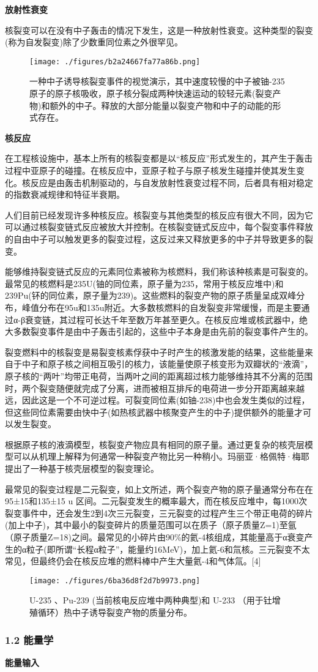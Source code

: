 \textbf{放射性衰变}

核裂变可以在没有中子轰击的情况下发生，这是一种放射性衰变。这种类型的裂变(称为自发裂变)除了少数重同位素之外很罕见。
\begin{figure}[ht]
\centering
\texttt{[image: ./figures/b2a24667fa77a86b.png]}
\caption{一种中子诱导核裂变事件的视觉演示，其中速度较慢的中子被铀-235原子的原子核吸收，原子核分裂成两种快速运动的较轻元素(裂变产物)和额外的中子。释放的大部分能量以裂变产物和中子的动能的形式存在。} \label{fig_HLB_1}
\end{figure}

\textbf{核反应}

在工程核设施中，基本上所有的核裂变都是以“核反应”形式发生的，其产生于轰击过程中亚原子的碰撞。在核反应中，亚原子粒子与原子核发生碰撞并使其发生变化。核反应是由轰击机制驱动的，与自发放射性衰变过程不同，后者具有相对稳定的指数衰减规律和特征半衰期。

人们目前已经发现许多种核反应。核裂变与其他类型的核反应有很大不同，因为它可以通过核裂变链式反应被放大并控制。在核裂变链式反应中，每个裂变事件释放的自由中子可以触发更多的裂变过程，这反过来又释放更多的中子并导致更多的裂变。

能够维持裂变链式反应的元素同位素被称为核燃料，我们称该种核素是可裂变的。最常见的核燃料是235U(铀的同位素，原子量为235，常用于核反应堆中)和239Pu(钚的同位素，原子量为239)。这些燃料的裂变产物的原子质量呈成双峰分布，峰值分布在95u和135u附近。大多数核燃料的自发裂变非常缓慢，而是主要通过α-β衰变链，其过程可长达千年至数万年甚至更久。在核反应堆或核武器中，绝大多数裂变事件是由中子轰击引起的，这些中子本身是由先前的裂变事件产生的。

裂变燃料中的核裂变是易裂变核素俘获中子时产生的核激发能的结果，这些能量来自于中子和原子核之间相互吸引的核力，该能量使原子核变形为双瓣状的“液滴”，原子核的“两叶”均带正电荷，当两叶之间的距离超过核力能够维持其不分离的范围时，两个裂变随便就完成了分离，进而被相互排斥的电荷进一步分开距离越来越远，因此这是一个不可逆过程。可裂变同位素(如铀-238)中也会发生类似的过程，但这些同位素需要由快中子(如热核武器中核聚变产生的中子)提供额外的能量才可以发生裂变。

根据原子核的液滴模型，核裂变产物应具有相同的原子量。通过更复杂的核壳层模型可以从机理上解释为何通常一种裂变产物比另一种稍小。玛丽亚·格佩特·梅耶提出了一种基于核壳层模型的裂变理论。

最常见的裂变过程是二元裂变，如上文所述，两个裂变产物的原子量通常分布在在95±15和135±15 u 区间。二元裂变发生的概率最大，而在核反应堆中，每1000次裂变事件中，还会发生2到4次三元裂变，三元裂变的过程产生三个带正电荷的碎片(加上中子)，其中最小的裂变碎片的质量范围可以在质子（原子质量Z=1)至氩（原子质量Z=18)之间。最常见的小碎片由90\%的氦-4核组成，其能量高于α衰变产生的α粒子(即所谓“长程α粒子”，能量约16MeV)，加上氦-6和氚核。三元裂变不太常见，但最终仍会在核反应堆的燃料棒中产生大量氦-4和气体氚。[4]
\begin{figure}[ht]
\centering
\texttt{[image: ./figures/6ba36d8f2d7b9973.png]}
\caption{U-235 、Pu-239 (当前核电反应堆中两种典型)和 U-233 （用于钍增殖循环）热中子诱导裂变产物的质量分布。} \label{fig_HLB_2}
\end{figure}

\subsubsection{1.2 能量学}
\textbf{能量输入}

